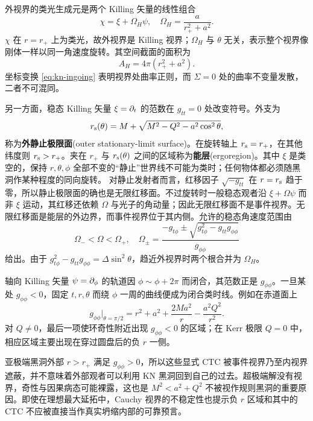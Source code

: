外视界的类光生成元是两个 Killing 矢量的线性组合
\begin{equation}\label{eq:kn-generator}
    \chi=\xi+\Omega_H\psi,
    \quad \Omega_H=\frac{a}{r_+^2+a^2}.
\end{equation}
$\chi$ 在 $r=r_+$ 上为类光，故外视界是 Killing 视界；$\Omega_H$ 与 $\theta$ 无关，表示整个视界像刚体一样以同一角速度旋转。其空间截面的面积为
\begin{equation}
    A_H=4\pi(r_+^2+a^2).
\end{equation}
坐标变换 \eqref{eq:kn-ingoing} 表明视界处曲率正则，而 $\Sigma=0$ 处的曲率不变量发散，二者不可混同。

另一方面，稳态 Killing 矢量 $\xi=\partial_t$ 的范数在 $g_{tt}=0$ 处改变符号。外支为
\begin{equation}
    r_{\rm s}(\theta)=M+
       \sqrt{M^2-Q^2-a^2\cos^2\theta},
\end{equation}
称为\textbf{外静止极限面}(outer stationary-limit surface)。在旋转轴上 $r_{\rm s}=r_+$，在其他纬度则 $r_{\rm s}>r_+$。夹在 $r_+$ 与 $r_{\rm s}(\theta)$ 之间的区域称为\textbf{能层}(ergoregion)。其中 $\xi$ 是类空的，保持 $r,\theta,\phi$ 全部不变的“静止”世界线不可能为类时；任何物体都必须随黑洞作某种程度的同向旋转。
对静止发射者而言，红移因子 $\sqrt{-g_{tt}}$ 在 $r=r_{\rm s}$ 趋于零，所以静止极限面的确也是无限红移面。不过旋转时一般稳态观者沿 $\xi+\Omega\psi$ 而非 $\xi$ 运动，其红移还依赖 $\Omega$ 与光子的角动量；因此无限红移面不是事件视界。无限红移面是能层的外边界，而事件视界位于其内侧。允许的稳态角速度范围由
\begin{equation}
    \Omega_-<\Omega<\Omega_+,
    \quad
    \Omega_\pm=\frac{-g_{t\phi}\pm
      \sqrt{g_{t\phi}^2-g_{tt}g_{\phi\phi}}}{g_{\phi\phi}}
\end{equation}
给出。由于 $g_{t\phi}^2-g_{tt}g_{\phi\phi}=\Delta\sin^2\theta$，趋近外视界时两个根合并为 $\Omega_H$。

轴向 Killing 矢量 $\psi=\partial_\phi$ 的轨道因 $\phi\sim\phi+2\pi$ 而闭合，其范数正是 $g_{\phi\phi}$。一旦某处 $g_{\phi\phi}<0$，固定 $t,r,\theta$ 而绕 $\phi$ 一周的曲线便成为闭合类时线。例如在赤道面上
\begin{equation}
    g_{\phi\phi}\big|_{\theta=\pi/2}
      =r^2+a^2+\frac{2Ma^2}{r}-\frac{a^2Q^2}{r^2}.
\end{equation}
对 $Q\ne0$，最后一项使环奇性附近出现 $g_{\phi\phi}<0$ 的区域；在 Kerr 极限 $Q=0$ 中，相应区域主要出现在穿过圆盘后的负 $r$ 一侧。

亚极端黑洞外部 $r>r_+$ 满足 $g_{\phi\phi}>0$，所以这些显式 CTC 被事件视界乃至内视界遮蔽，并不意味着外部观者可以利用 KN 黑洞回到自己的过去。超极端解没有视界，奇性与因果病态可能裸露，这也是 $M^2<a^2+Q^2$ 不被视作规则黑洞的重要原因。即使在理想最大延拓中，Cauchy 视界的不稳定性也提示负 $r$ 区域和其中的 CTC 不应被直接当作真实坍缩内部的可靠预言。

